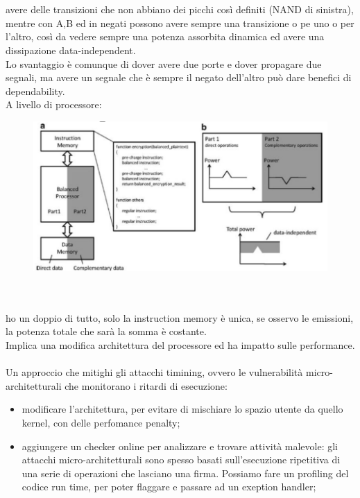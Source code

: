 \documentclass[oneside, 12pt]{extbook}
\begin{document}
\\\\avere delle transizioni che non abbiano dei picchi così definiti (NAND di sinistra), mentre con A,B ed in negati possono avere sempre una transizione o pe uno o per l'altro, così da vedere sempre una potenza assorbita dinamica ed avere una dissipazione data-independent.
\\Lo svantaggio è comunque di dover avere due porte e dover propagare due segnali, ma avere un segnale che è sempre il negato dell'altro può dare benefici di dependability.
\\A livello di processore:\\
\begin{figure}[!h]
	\includegraphics[scale=0.3]{immagini/hardware/vsc.png}
\end{figure}
\\\\ho un doppio di tutto, solo la instruction memory è unica, se osservo le emissioni, la potenza totale che sarà la somma è costante.
\\Implica una modifica architettura del processore ed ha impatto sulle performance.
\\\\Un approccio che mitighi gli attacchi timining, ovvero le vulnerabilità micro-architetturali che monitorano i ritardi di esecuzione:
\begin{itemize}
	\item modificare l'architettura, per evitare di mischiare lo spazio utente da quello kernel, con delle perfomance penalty;
	\item aggiungere un checker online per analizzare e trovare attività malevole: gli attacchi micro-architetturali sono spesso basati sull'esecuzione ripetitiva di una serie di operazioni che lasciano una firma. Possiamo fare un profiling del codice run time, per poter flaggare e passare ad un exeption handler;
\end{itemize}
\end{document}
